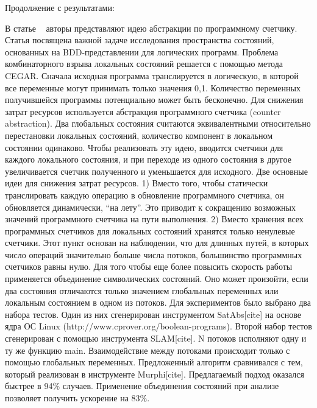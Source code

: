 Продолжение с результатами: ~\cite{Ghafari:2010}

В статье ~\cite{Basler:2009} авторы представляют идею абстракции по программному счетчику. Статья посвящена важной задаче исследования пространства состояний, основанных на BDD-представлении для логических программ. Проблема комбинаторного взрыва локальных состояний решается с помощью метода CEGAR. 
Сначала исходная программа транслируется в логическую, в которой все переменные могут принимать только значения {0,1}. Количество переменных получившейся программы потенциально может быть бесконечно. 
Для снижения затрат ресурсов используется абстракция программного счетчика (counter abstraction). Два глобальных состояния считаются эквивалентными относительно перестановки локальных состояний, количество компонент в локальном состоянии одинаково. Чтобы реализовать эту идею, вводится счетчики для каждого локального состояния, и при переходе из одного состояния в другое увеличивается счетчик полученного и уменьшается для исходного. 
Две основные идеи для снижения затрат ресурсов. 
1) Вместо того, чтобы статически транслировать каждую операцию в обновление программного счетчика, он обновляется динамически, “на лету”. Это приводит к сокращению возможных значений программного счетчика на пути выполнения.
2) Вместо хранения всех программных счетчиков для локальных состояний хранятся только ненулевые счетчики. Этот пункт основан на наблюдении, что для длинных путей, в которых число операций значительно больше числа потоков, большинство программных счетчиков равны нулю.
Для того чтобы еще более повысить скорость работы применяется объединение символических состояний. Оно может произойти, если два состояния отличаются только значением глобальных переменных или локальным состоянием в одном из потоков. 
Для экспериментов было выбрано два набора тестов. Один из них сгенерирован инструментом SatAbs[cite] на основе ядра ОС Linux (http://www.cprover.org/boolean-programs). Второй набор тестов сгенерирован с помощью инструмента SLAM[cite]. N потоков исполняют одну и ту же функцию main. Взаимодействие между потоками происходит только с помощью глобальных переменных. Предложенный алгоритм сравнивался с тем, который реализован в инструменте Murphi[cite]. Предлагаемый подход оказался быстрее в 94\% случаев. Применение объединения состояний при анализе позволяет получить ускорение на 83\%. 

